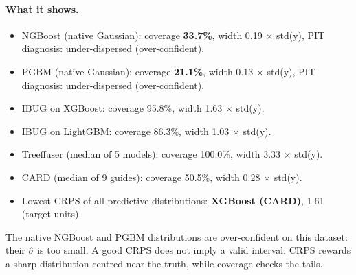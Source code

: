 \documentclass[11pt]{article}
\begin{document}
\paragraph{What it shows.}
\begin{itemize}
\item NGBoost (native Gaussian): coverage \textbf{33.7\%}, width 0.19 $\times$ std(y), PIT diagnosis: under-dispersed (over-confident).
\item PGBM (native Gaussian): coverage \textbf{21.1\%}, width 0.13 $\times$ std(y), PIT diagnosis: under-dispersed (over-confident).
\item IBUG on XGBoost: coverage 95.8\%, width 1.63 $\times$ std(y).
\item IBUG on LightGBM: coverage 86.3\%, width 1.03 $\times$ std(y).
\item Treeffuser (median of 5 models): coverage 100.0\%, width 3.33 $\times$ std(y).
\item CARD (median of 9 guides): coverage 50.5\%, width 0.28 $\times$ std(y).
\item Lowest CRPS of all predictive distributions: \textbf{XGBoost (CARD)}, 1.61 (target units).
\end{itemize}
\begin{insight}[Takeaway RQ3]
The native NGBoost and PGBM distributions are over-confident on this dataset: their $\sigma$̂ is too small. A good CRPS does not imply a valid interval: CRPS rewards a sharp distribution centred near the truth, while coverage checks the tails.
\end{insight}
\end{document}
